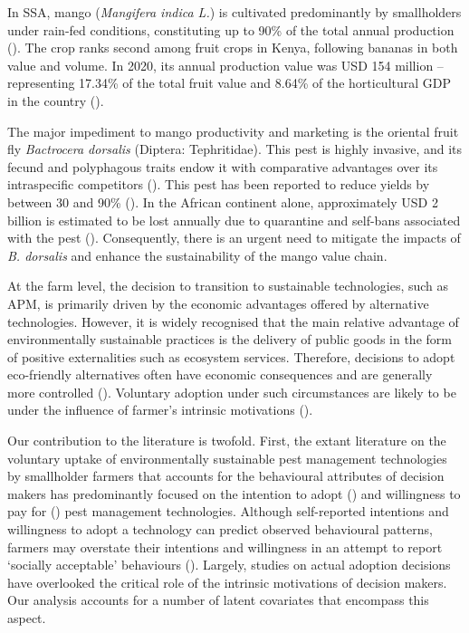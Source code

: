 \documentclass[fleqn,twoside,reqno]{article}
\begin{document}
In SSA, mango (\textit{Mangifera indica L.}) is cultivated predominantly by smallholders under rain-fed conditions, constituting up to 90\% of the total annual production (\cite{Ndlela2022}). The crop ranks second among fruit crops in Kenya, following bananas in both value and volume. In 2020, its annual production value was USD 154 million --representing 17.34\% of the total fruit value and 8.64\% of the horticultural GDP in the country (\cite{HCD2021}).

The major impediment to mango productivity and marketing is the oriental fruit fly \textit{Bactrocera dorsalis} (Diptera: Tephritidae). This pest is highly invasive, and its fecund and polyphagous traits endow it with comparative advantages over its intraspecific competitors (\cite{Mutamiswa2021}). This pest has been reported to reduce yields by between 30 and 90\% (\cite{Vayssieres2009}). In the African continent alone, approximately USD 2 billion is estimated to be lost annually due to quarantine and self-bans associated with the pest (\cite{Korir2015}). Consequently, there is an urgent need to mitigate the impacts of \textit{B. dorsalis} and enhance the sustainability of the mango value chain.

At the farm level, the decision to transition to sustainable technologies, such as APM, is primarily driven by the economic advantages offered by alternative technologies. However, it is widely recognised that the main relative advantage of environmentally sustainable practices is the delivery of public goods in the form of positive externalities such as ecosystem services. Therefore, decisions to adopt eco-friendly alternatives often have economic consequences and are generally more controlled (\cite{Dessart2019}). Voluntary adoption under such circumstances are likely to be under the influence of farmer’s intrinsic motivations (\cite{Ejelov2022, Meijer2015, Runhaar2017, Schoonhoven2018}).

Our contribution to the literature is twofold. First, the extant literature on the voluntary uptake of environmentally sustainable pest management technologies by smallholder farmers that accounts for the behavioural attributes of decision makers has predominantly focused on the intention to adopt (\cite{Despotovic2019, Khan2021, Punzano2021}) and willingness to pay for (\cite{Muriithi2021, Nyangau2022, Petrescu2019}) pest management technologies. Although self-reported intentions and willingness to adopt a technology can predict observed behavioural patterns, farmers may overstate their intentions and willingness in an attempt to report ‘socially acceptable’ behaviours (\cite{Khan2021,Petrescu2019}). Largely, studies on actual adoption decisions have overlooked the critical role of the intrinsic motivations of decision makers. Our analysis accounts for a number of latent covariates that encompass this aspect.
\end{document}

